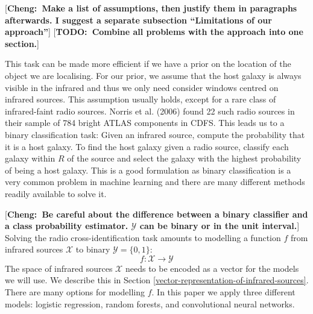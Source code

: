 \documentclass[fleqn,usenatbib,usedcolumn]{mnras}
\newcommand{\cheng}[1]{ {\color{teal}[{\bf Cheng:~{#1}}]} }
\newcommand{\todo}[1]{ {\color{red}[{\bf TODO:~{#1}}]} }
\begin{document}
    \cheng{Make a list of assumptions, then justify them in paragraphs afterwards.
      I suggest a separate subsection ``Limitations of our approach''}
    \todo{Combine all problems with the approach into one section.}

    This task can be made more efficient if we have a prior on the location of
    the object we are localising. For our prior, we assume that the host galaxy
    is always visible in the infrared and thus we only need consider windows
    centred on infrared sources. This assumption usually holds, except for a
    rare class of infrared-faint radio sources. Norris et al. (2006) found 22
    such radio sources in their sample of 784 bright ATLAS components in CDFS.
    This leads us to a binary classification task: Given an infrared source,
    compute the probability that it is a host galaxy. To find the host galaxy
    given a radio source, classify each galaxy within
    \(R\) of the source and select the galaxy with the highest probability of
    being a host galaxy. This is a good formulation as binary classification
    is a very common problem in machine learning and there are many different
    methods readily available to solve it.

    \cheng{Be careful about the difference between a binary classifier and
      a class probability estimator. $\mathcal{Y}$ can be binary or in the unit interval.}
    Solving the radio cross-identification task amounts to modelling a
    function $f$ from infrared sources $\mathcal{X}$ to binary
    $\mathcal{Y} = \{0, 1\}$:
    \begin{equation}
        f : \mathcal{X} \to \mathcal{Y}
    \end{equation}
    The space of infrared sources $\mathcal{X}$ needs to be encoded as a
    vector for the models we will use. We describe this in Section
    \ref{vector-representation-of-infrared-sources}.
    There are many options for modelling $f$. In this paper we
    apply three different models: logistic regression, random forests, and
    convolutional neural networks.
\end{document}
